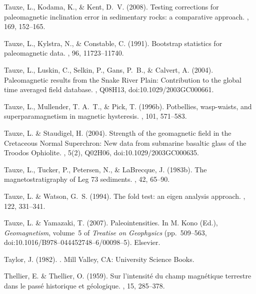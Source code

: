 \documentclass[11pt]{book}
\begin{document}
\begin{thebibliography}{}
Tauxe, L., Kodama, K., \& Kent, D.~V. (2008).
\newblock Testing corrections for paleomagnetic inclination error in
  sedimentary rocks: a comparative approach.
, 169, 152--165.

Tauxe, L., Kylstra, N., \& Constable, C. (1991).
\newblock Bootstrap statistics for paleomagnetic data.
, 96, 11723--11740.

Tauxe, L., Luskin, C., Selkin, P., Gans, P.~B., \& Calvert, A. (2004).
\newblock Paleomagnetic results from the Snake River Plain: Contribution to the
  global time averaged field database.
, Q08H13, doi:10.1029/2003GC000661.

Tauxe, L., Mullender, T. A.~T., \& Pick, T. (1996b).
\newblock Potbellies, wasp-waists, and superparamagnetism in magnetic
  hysteresis.
, 101, 571--583.

Tauxe, L. \& Staudigel, H. (2004).
\newblock Strength of the geomagnetic field in the Cretaceous Normal
  Superchron: New data from submarine basaltic glass of the Troodos Ophiolite.
, 5(2), Q02H06,
  doi:10.1029/2003GC000635.

Tauxe, L., Tucker, P., Petersen, N., \& LaBrecque, J. (1983b).
\newblock The magnetostratigraphy of Leg 73 sediments.
, 42, 65--90.

Tauxe, L. \& Watson, G.~S. (1994).
\newblock The fold test: an eigen analysis approach.
, 122, 331--341.

Tauxe, L. \& Yamazaki, T. (2007).
\newblock Paleointensities.
\newblock In M. Kono (Ed.), {\em Geomagnetism}, volume~5 of {\em Treatise on
  Geophysics}  (pp.\ 509--563, doi:10.1016/B978--044452748--6/00098--5).
  Elsevier.

Taylor, J. (1982).
.
\newblock Mill Valley, CA: University Science Books.

Thellier, E. \& Thellier, O. (1959).
\newblock Sur l'intensit\' e du champ magn\' etique terrestre dans le pass\' e
  historique et g\' eologique.
, 15, 285--378.


\end{thebibliography}
\end{document}
